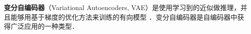 
\textbf{变分自编码器}（Variational Autoencoders, VAE）是使用学习到的近似做推理，并且能够用基于梯度的优化方法来训练的有向模型 \cite{GDL}．变分自编码器是自编码器中获得广泛应用的一种类型．



